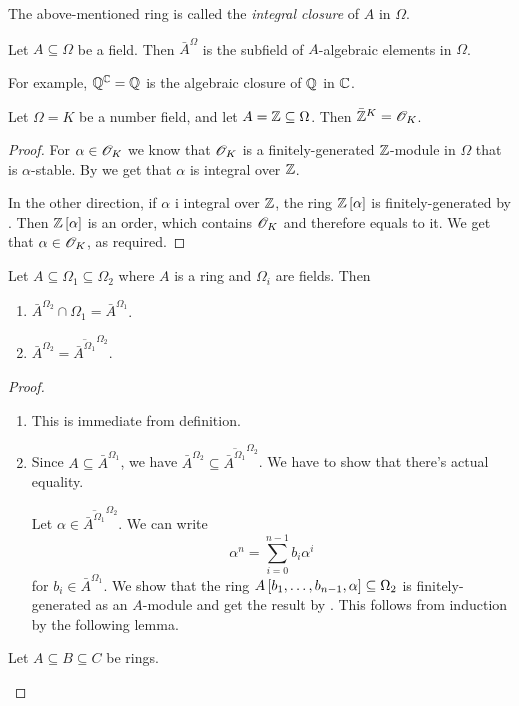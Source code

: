 \documentclass[11pt]{article}
\begin{document}
\begin{definition}
The above-mentioned ring is called the \emph{integral closure} of $A$ in $\Omega$.
\end{definition}

\begin{example}
Let $A \subseteq \Omega$ be a field. Then $\bar{A}^{\Omega}$ is the subfield of $A$-algebraic elements in $\Omega$.

For example, $\mathbb{Q}^{\mathbb{C}} = \mathbb{Q}$ is the algebraic closure of $\mathbb{Q}$ in $\mathbb{C}$.
\end{example}

\begin{proposition}
Let $\Omega = K$ be a number field, and let $A = \mathbb{Z} \subseteq \Omega$.
Then $\bar{\mathbb{Z}}^K = \mathcal{O}_K$. 
\end{proposition}

\begin{proof}
For $\alpha \in \mathcal{O}_K$ we know that $\mathcal{O}_K$ is a finitely-generated $\mathbb{Z}$-module in $\Omega$ that is $\alpha$-stable. By  we get that $\alpha$ is integral over $\mathbb{Z}$.

In the other direction, if $\alpha$ i integral over $\mathbb{Z}$, the ring $\mathbb{Z}\left[ \alpha \right]$ is finitely-generated by . Then $\mathbb{Z}\left[ \alpha \right]$ is an order, which contains $\mathcal{O}_K$ and therefore equals to it. We get that $\alpha \in \mathcal{O}_K$, as required.
\end{proof}

\begin{lemma}
Let $A \subseteq \Omega_1 \subseteq \Omega_2$ where $A$ is a ring and $\Omega_i$ are fields. Then
\begin{enumerate}
\item $\bar{A}^{\Omega_2} \cap \Omega_1 = \bar{A}^{\Omega_1}$.
\item $\bar{A}^{\Omega_2} = \overline{\bar{A}^{\Omega_1}}^{\Omega_2}$.
\end{enumerate}
\end{lemma}

\begin{proof}
\begin{enumerate}
\item%
This is immediate from definition.
\item%
Since $A \subseteq \bar{A}^{\Omega_1}$, we have $\bar{A}^{\Omega_2} \subseteq \overline{\bar{A}^{\Omega_1}}^{\Omega_2}$. We have to show that there's actual equality.

Let $\alpha \in \overline{\bar{A}^{\Omega_1}}^{\Omega_2}$. We can write
\[\alpha^n = \sum_{i = 0}^{n-1} b_i \alpha^i\]
for $b_i \in \bar{A}^{\Omega_1}$.
We show that the ring $A\left[ b_1, \ldots, b_{n-1}, \alpha \right] \subseteq \Omega_2$ is finitely-generated as an $A$-module and get the result by . 
This follows from induction by the following lemma.
\end{enumerate}

\begin{lemma}
Let $A \subseteq B \subseteq C$ be rings.
\end{lemma}
\end{proof}
\end{document}
